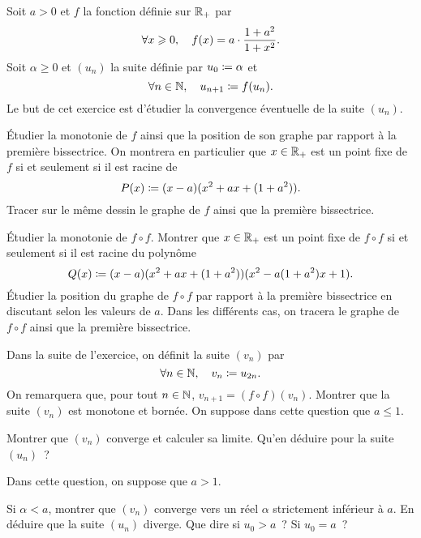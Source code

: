 \documentclass{magnolia}
\begin{document}
Soit $a>0$ et $f$ la fonction définie sur $\mathbb{R}_+$ par
\[\forall x\geqslant 0 ,\quad f(x)=a\cdot \frac{1+a^2}{1+x^2}.\]
Soit $\alpha\geq 0$ et $(u_n)$ la suite définie par $u_0\coloneqq\alpha$ et
\[\forall n\in\mathbb{N} ,\quad u_{n+1}\coloneqq f(u_n).\]
Le but de cet exercice est d'étudier la convergence éventuelle de la suite $(u_n)$.
\begin{questions}
\question 
  \begin{questions}
  \question Étudier la monotonie de $f$ ainsi que la position de son graphe par
    rapport à la première bissectrice. On montrera en particulier que
    $x\in\mathbb{R}_+$ est un point fixe de $f$ si et seulement si il est racine de
    \[P(x)\coloneqq (x-a)(x^2+ax+(1+a^2)).\]
  \question Tracer sur le même dessin le graphe de $f$ ainsi que la première
    bissectrice.
  \end{questions}
\question 
  \begin{questions}
  \question Étudier la monotonie de $f\circ f$.
  \question Montrer que $x\in\mathbb{R}_+$ est un point fixe de $f\circ f$ si et
    seulement si il est racine du polynôme
    \[Q(x)\coloneqq (x-a)(x^2+ax+(1+a^2))(x^2-a(1+a^2)x+1).\]
  \question Étudier la position du graphe de $f\circ f$ par rapport à la
    première bissectrice en discutant selon les valeurs de $a$. Dans les
    différents cas, on tracera le graphe de $f\circ f$ ainsi que la
    première bissectrice.
  \end{questions}
\enonce Dans la suite de l'exercice, on définit la suite $(v_n)$ par
  \[\forall n\in\mathbb{N} ,\quad v_n\coloneqq u_{2n}.\]
  On remarquera que, pour tout $n\in\mathbb{N}$, $v_{n+1}=(f\circ f)(v_n)$.
\question Montrer que la suite $(v_n)$ est monotone et bornée.
\question On suppose dans cette question que $a\leq 1$.
  \begin{questions}
  \question Montrer que $(v_n)$ converge et calculer sa limite.
  \question Qu'en déduire pour la suite $(u_n)$~?
  \end{questions}
\question Dans cette question, on suppose que $a>1$.
  \begin{questions}
  \question Si $\alpha<a$, montrer que $(v_n)$ converge vers un réel $\alpha$
    strictement inférieur à $a$. En déduire que la suite $(u_n)$ diverge.
  \question Que dire si $u_0>a$~? Si $u_0=a$~?
  \end{questions}
\end{questions}

\end{document}
